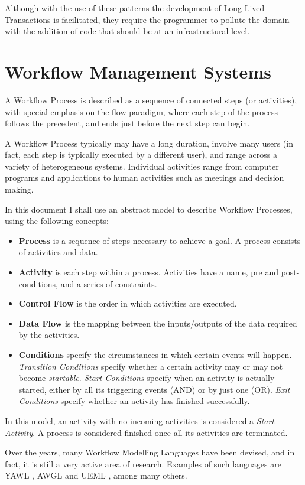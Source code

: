 Although with the use of these patterns the development of Long-Lived
Transactions is facilitated, they require the programmer to pollute
the domain with the addition of code that should be at an
infrastructural level.

\section{Workflow Management Systems}

A Workflow Process is described as a sequence of connected steps (or
activities), with special emphasis on the flow paradigm, where each
step of the process follows the precedent, and ends just before the
next step can begin.

A Workflow Process typically may have a long duration, involve many
users (in fact, each step is typically executed by a different user),
and range across a variety of heterogeneous systems. Individual
activities range from computer programs and applications to human
activities such as meetings and decision making.

In this document I shall use an abstract model to describe Workflow
Processes, using the following concepts:
\begin{itemize}
\item {\bf Process} is a sequence of steps necessary to achieve a
  goal. A process consists of activities and data.
\item {\bf Activity} is each step within a process. Activities have a
  name, pre and post-conditions, and a series of constraints.
\item {\bf Control Flow} is the order in which activities are
  executed.
\item {\bf Data Flow} is the mapping between the inputs/outputs of the
  data required by the activities.
\item {\bf Conditions} specify the circumstances in which certain
  events will happen. {\it Transition Conditions} specify whether a
  certain activity may or may not become {\it startable}. {\it Start
    Conditions} specify when an activity is actually started, either
  by all its triggering events (AND) or by just one (OR). {\it Exit
    Conditions} specify whether an activity has finished successfully.
\end{itemize}
In this model, an activity with no incoming activities is considered a
{\it Start Activity}. A process is considered finished once all its
activities are terminated.

Over the years, many Workflow Modelling Languages have been devised,
and in fact, it is still a very active area of research. Examples of
such languages are YAWL \cite{van2005yawl}, AWGL
\cite{fahringer2005specification} and UEML \cite{vernadat2002ueml}, among
many others.

